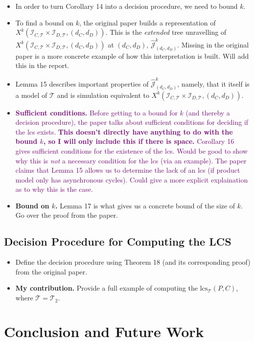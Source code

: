 \documentclass[a4paper,USenglish,cleveref,autoref,thm-restate]{lipics-v2021}
\newcommand{\interpretation}{\mathcal{I}}
\newcommand{\TBox}{\mathcal{T}}
\newcommand{\lcs}[2]{\text{lcs}_{\TBox}(#1, #2)}
\newcommand{\canonical}[2]{\interpretation_{#1, #2}}
\newcommand{\kchar}[3]{X^{#1}(#2, #3)}
\newcommand{\productmodel}{\canonical{C}{\TBox} \times \canonical{D}{\TBox}}
\newcommand{\kcharproduct}{\kchar{k}{\productmodel}{(d_C, d_D)}}
\newcommand{\extendedtree}{\hat{\mathcal{J}}^{k}_{(d_C, d_D)}}
\begin{document}
    \begin{itemize}
        \item In order to turn Corollary 14 into a decision procedure, we need to bound $k$. 
        \item To find a bound on $k$, the original paper builds a representation of $\kcharproduct$. 
        This is the \textit{extended} tree unravelling of $\kcharproduct$ at $(d_C, d_D)$, $\extendedtree$. 
        Missing in the original paper is a more concrete example of how this interpretation is built. Will add this in the report. 
        \item Lemma 15 describes important properties of $\extendedtree$, namely, that it itself is a model of $\TBox$ and is 
        simulation equivalent to $\kcharproduct$.
        \item \textcolor{purple}{\textbf{Sufficient conditions.} Before getting to a bound for $k$ (and thereby a decision procedure), the paper talks about sufficient conditions 
        for deciding if the lcs exists. \textbf{This doesn't directly have anything to do with the bound $k$, so I will only include this if there is space.}
        Corollary 16 gives sufficient conditions for the existence of the lcs. Would be good to show 
        why this is \textit{not} a necessary condition for the lcs (via an example). The paper claims that Lemma 15 allows us to determine 
        the lack of an lcs (if product model only has asynchronous cycles). Could give a more explicit explaination as to why this is the case.}
        \item \textbf{Bound on $k$.} Lemma 17 is what gives us a concrete bound of the size of $k$. Go over the proof from the paper. 
    \end{itemize}
\subsection{Decision Procedure for Computing the LCS}
    \begin{itemize}
        \item Define the decision procedure using Theorem 18 (and its corresponding proof) from the original paper.
        \item \textbf{My contribution.} Provide a full example of computing the $\lcs{P}{C}$, where $\TBox = \TBox_2$. 
    \end{itemize}


\section{Conclusion and Future Work}
\end{document}
